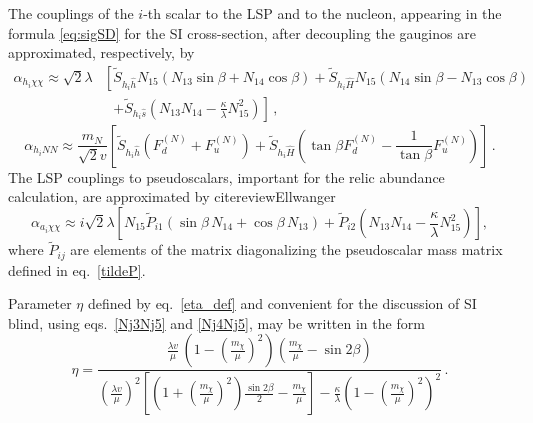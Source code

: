 \documentclass[12pt,twoside]{article}
\def\nn{\nonumber \\}
\begin{document}
The couplings of the $i$-th scalar to the LSP and to the 
nucleon, appearing in the formula \eqref{eq:sigSD} for 
the SI cross-section, 
after decoupling the gauginos are approximated, respectively, by
%
\begin{align}
\alpha_{h_i\chi\chi}
\approx
\sqrt{2}\lambda 
&\left[
\tilde{S}_{{h_i}\hat{h}}N_{15}\left(N_{13}\sin\beta+N_{14}\cos\beta\right)
+\tilde{S}_{{h_i}\hat{H}}N_{15}\left(N_{14}\sin\beta-N_{13}\cos\beta\right)
\right.\nn&\,\,\,\,\left.
+\tilde{S}_{{h_i}\hat{s}}
\left({N_{13}}{N_{14}}-\frac{\kappa}{\lambda}N_{15}^2\right)
\right]
\,,
\label{alpha-h00_G}
\end{align}
%
%
\begin{equation}
\label{alpha-hNN_G}
\alpha_{h_iNN}
\approx
\frac{m_N}{\sqrt{2}v} 
\left[
\tilde{S}_{{h_i}\hat{h}}\left(F^{(N)}_d+F^{(N)}_u\right)
+\tilde{S}_{{h_i}\hat{H}} \left(\tan\beta F^{(N)}_d-\frac{1}{\tan\beta} F^{(N)}_u \right)
\right]\,.
\end{equation}
%
The LSP couplings to pseudoscalars, important for the relic abundance 
calculation, are approximated by cite{reviewEllwanger}
%
\begin{equation}
\label{alpha-a00_G}
\alpha_{a_i\chi\chi}
\approx i\sqrt{2}\lambda\left[
N_{15}\tilde{P}_{i1}(\sin\beta\,N_{14}+\cos\beta\,N_{13})
+\tilde{P}_{i2}\left({N_{13}}{N_{14}}-\frac{\kappa}{\lambda}N_{15}^2\right)
\right]
,
\end{equation}
%
where $\tilde{P}_{ij}$ are elements of the matrix diagonalizing 
the pseudoscalar mass matrix defined in eq.~\eqref{tildeP}.


Parameter $\eta$ defined by eq.~\eqref{eta_def} and convenient 
for the discussion of SI blind, using eqs.~\eqref{Nj3Nj5} and \eqref{Nj4Nj5}, 
may be written in the form
%
\begin{equation}
\label{eta_lambda/mu}
\eta
=
\frac{\frac{\lambda v}{\mu}\,
\left(1-\left(\frac{m_{\chi}}{\mu}\right)^2\right)
\left(\frac{m_{\chi}}{\mu}-\sin2\beta\right)}
{
\left(\frac{\lambda v}{\mu}\right)^2
\left[\left(1+\left(\frac{m_{\chi}}{\mu}\right)^2\right)\frac{\sin2\beta}{2}-\frac{m_{\chi}}{\mu}\right]
-\frac{\kappa}{\lambda}\left(1-\left(\frac{m_{\chi}}{\mu}\right)^2\right)^2
}\,.
\end{equation}
%
\end{document}
